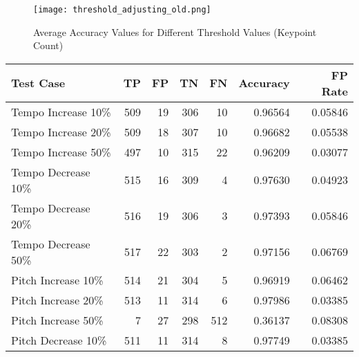 \begin{figure}[H]
    \centering
    \texttt{[image: threshold\_adjusting\_old.png]}
    \caption{Average Accuracy Values for Different Threshold Values (Keypoint Count)}
    \label{fig:threshold_old}
  \end{figure}
  


\begin{table}[H]
    \begin{tabular}{|l|r|r|r|r|r|r|}
        \hline
        \textbf{Test Case}                  & \textbf{TP}   & \textbf{FP} & \textbf{TN} & \textbf{FN} & \textbf{Accuracy} & \textbf{FP Rate} \\ \hline
        Tempo Increase 10\%                & 509         & 19          & 306         & 10          & 0.96564           & 0.05846          \\ \hline
        Tempo Increase 20\%                & 509         & 18          & 307         & 10          & 0.96682           & 0.05538          \\ \hline
        Tempo Increase 50\%                & 497         & 10          & 315         & 22          & 0.96209           & 0.03077          \\ \hline
        Tempo Decrease 10\%                & 515         & 16          & 309         & 4           & 0.97630           & 0.04923          \\ \hline
        Tempo Decrease 20\%                & 516         & 19          & 306         & 3           & 0.97393           & 0.05846          \\ \hline
        Tempo Decrease 50\%                & 517         & 22          & 303         & 2           & 0.97156           & 0.06769          \\ \hline
        Pitch Increase 10\%                & 514         & 21          & 304         & 5           & 0.96919           & 0.06462          \\ \hline
        Pitch Increase 20\%                & 513         & 11          & 314         & 6           & 0.97986           & 0.03385          \\ \hline
        Pitch Increase 50\%                & 7           & 27          & 298         & 512         & 0.36137           & 0.08308          \\ \hline
        Pitch Decrease 10\%                & 511         & 11          & 314         & 8           & 0.97749           & 0.03385          \\ \hline

\end{tabular}
\end{table}

